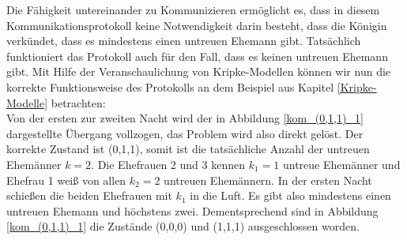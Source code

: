 Die Fähigkeit untereinander zu Kommunizieren ermöglicht es, dass in diesem Kommunikationsprotokoll keine Notwendigkeit darin besteht, dass die Königin verkündet, dass es mindestens einen untreuen Ehemann gibt. Tatsächlich funktioniert das Protokoll auch für den Fall, dass es keinen untreuen Ehemann gibt.
Mit Hilfe der Veranschaulichung von Kripke-Modellen können wir nun die korrekte Funktionsweise des Protokolls an dem Beispiel aus Kapitel \ref{Kripke-Modelle} betrachten:\\
Von der ersten zur zweiten Nacht wird der in Abbildung \ref{kom_(0,1,1)_1} dargestellte Übergang vollzogen, das Problem wird also direkt gelöst.
Der korrekte Zustand ist (0,1,1), somit ist die tatsächliche Anzahl der untreuen Ehemänner $k=2$. Die Ehefrauen 2 und 3 kennen $k_1 = 1$ untreue Ehemänner und Ehefrau 1 weiß von allen $k_2 = 2$ untreuen Ehemännern.
In der ersten Nacht schießen die beiden Ehefrauen mit $k_1$ in die Luft. Es gibt also mindestens einen untreuen Ehemann und höchstens zwei.
Dementsprechend sind in Abbildung \ref{kom_(0,1,1)_1} die Zustände (0,0,0) und (1,1,1) ausgeschlossen worden.

